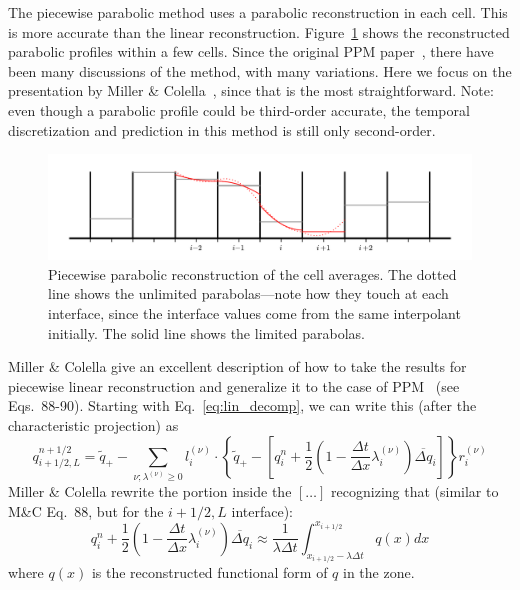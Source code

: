 The piecewise parabolic method uses a parabolic reconstruction in each
cell.  This is more accurate than the linear reconstruction.
Figure~\ref{fig:ppm} shows the reconstructed parabolic profiles within
a few cells.  Since the original PPM
paper~\cite{colellawoodward:1984}, there have been many discussions of
the method, with many variations.  Here we focus on the presentation
by Miller \& Colella~\cite{millercolella:2002}, since that is the most
straightforward.  Note: even though a parabolic profile could be
third-order accurate, the temporal discretization and prediction in
this method is still only second-order.
%
\begin{figure}[t]
\centering
\includegraphics[width=\linewidth]{piecewise-parabolic}
\caption[Piecewise parabolic reconstruction of the cell
  averages]{\label{fig:ppm} Piecewise parabolic reconstruction of the
  cell averages.  The dotted line shows the unlimited parabolas---note
  how they touch at each interface, since the interface values come
  from the same interpolant initially.  The solid line shows the
  limited parabolas.}
\end{figure}


Miller \& Colella give an excellent description of how to take the
results for piecewise linear reconstruction and generalize it to the case of
PPM~\cite{colellawoodward:1984} (see Eqs.\ 88-90).  Starting with
Eq.~\ref{eq:lin_decomp}, we can write this (after the characteristic
projection) as
\begin{equation}
q_{i+1/2,L}^{n+1/2} = \tilde{q}_+ -
   \sum_{\nu;\lambda^{(\nu)}\ge 0} l_i^{(\nu)} \cdot \left \{
        \tilde{q}_+ - \left [ q_i^n +
            \frac{1}{2} \left ( 1 - \frac{\Delta t}{\Delta x} \lambda_i^{(\nu)} \right ) \overline{\Delta q}_i \right ]
       \right \} r_i^{(\nu)}
\end{equation}
Miller \& Colella rewrite the portion inside the $[\ldots]$
recognizing that (similar to M\&C Eq.\ 88, but for the $i+1/2,L$ interface):
\begin{equation}
  q_i^n + \frac{1}{2} \left (1 - \frac{\Delta t}{\Delta x} \lambda_i^{(\nu)} \right ) \overline{\Delta q}_i
  \approx \frac{1}{\lambda \Delta t} \int_{x_{i+1/2} - \lambda \Delta t}^{x_{i+1/2}}
           q(x) dx
\end{equation}
where $q(x)$ is the reconstructed functional form of $q$ in the zone.

